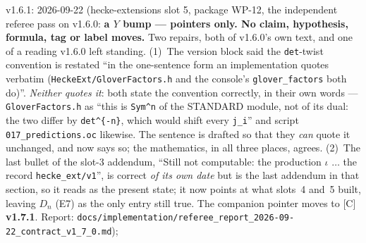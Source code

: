 \documentclass[11pt]{article}
\theoremstyle{remark}
\newcommand{\Dn}{D_n}
\begin{document}
v1.6.1: 2026-09-22 (hecke-extensions slot 5, package WP-12, the independent
referee pass on v1.6.0: \textbf{a $Y$ bump --- pointers only. No claim, hypothesis, formula,
tag or label moves.} Two repairs, both of v1.6.0's own text, and one of a reading v1.6.0 left
standing. (1)~The version block said the \texttt{det}-twist convention is restated ``in the
one-sentence form an implementation quotes verbatim (\texttt{HeckeExt/GloverFactors.h} and the
console's \texttt{glover\_factors} both do)''. \emph{Neither quotes it}: both state the
convention correctly, in their own words --- \texttt{GloverFactors.h} as ``this is
\texttt{Sym\^{}n} of the STANDARD module, not of its dual: the two differ by
\texttt{det\^{}\{-n\}}, which would shift every \texttt{j\_i}'' and script
\texttt{017\_predictions.oc} likewise. The sentence is drafted so that they \emph{can} quote it
unchanged, and now says so; the mathematics, in all three places, agrees. (2)~The last bullet
of the slot-3 addendum, ``Still not computable: the production $\iota$ $\ldots$ the record
\texttt{hecke\_ext/v1}'', is correct \emph{of its own date} but is the last addendum in that
section, so it reads as the present state; it now points at what slots~4 and~5 built, leaving
$\Dn$ (E7) as the only entry still true. The companion pointer moves to [C] \textbf{v1.7.1}.
Report: \texttt{docs/implementation/referee\_report\_2026-09-22\_contract\_v1\_7\_0.md});
\end{document}
